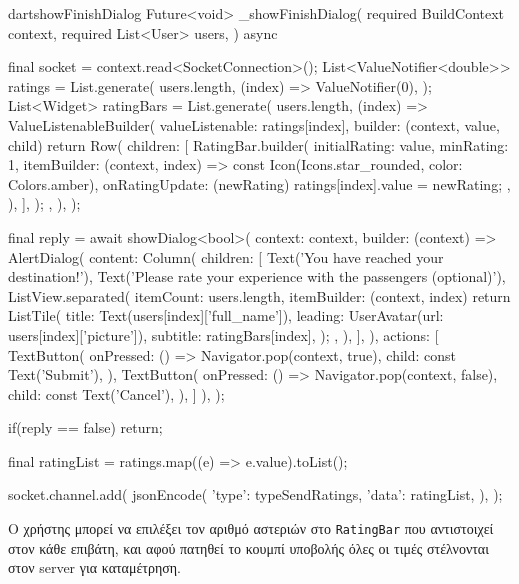 \documentclass[../thesis.tex]{subfiles}
\begin{document}
\begin{codeblock}{dart}{showFinishDialog}
  Future<void> _showFinishDialog({
    required BuildContext context,
    required List<User> users,
  }) async {
    final socket = context.read<SocketConnection>();
    List<ValueNotifier<double>> ratings = List.generate(
      users.length,
      (index) => ValueNotifier(0),
    );
    List<Widget> ratingBars = List.generate(
      users.length,
      (index) => ValueListenableBuilder(
        valueListenable: ratings[index],
        builder: (context, value, child) {
          return Row(
            children: [
              RatingBar.builder(
                initialRating: value,
                minRating: 1,
                itemBuilder: (context, index) =>
                    const Icon(Icons.star_rounded, color: Colors.amber),
                onRatingUpdate: (newRating) {
                  ratings[index].value = newRating;
                },
              ),
            ],
          );
        },
      ),
    );

    final reply = await showDialog<bool>(
      context: context,
      builder: (context) => AlertDialog(
        content: Column(
          children: [
            Text('You have reached your destination!'),
            Text('Please rate your experience with the passengers (optional)'),
            ListView.separated(
              itemCount: users.length,
              itemBuilder: (context, index) {
                return ListTile(
                  title: Text(users[index]['full_name']),
                  leading: UserAvatar(url: users[index]['picture']),
                  subtitle: ratingBars[index],
                );
              },
            ),
          ],
        ),
        actions: [
          TextButton(
            onPressed: () => Navigator.pop(context, true),
            child: const Text('Submit'),
          ),
          TextButton(
            onPressed: () => Navigator.pop(context, false),
            child: const Text('Cancel'),
          ),
        ]
      ),
    );

    if(reply == false) return;

    final ratingList = ratings.map((e) => e.value).toList();

    socket.channel.add(
      jsonEncode({
        'type': typeSendRatings,
        'data': ratingList,
      }),
    );
  }
\end{codeblock}

Ο χρήστης μπορεί να επιλέξει τον αριθμό αστεριών στο \texttt{RatingBar} που αντιστοιχεί στον κάθε επιβάτη, και αφού πατηθεί το κουμπί υποβολής όλες οι τιμές στέλνονται στον server για καταμέτρηση.
\end{document}
